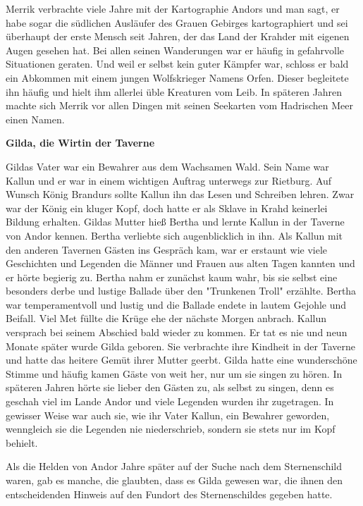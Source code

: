 \documentclass[10pt, a4paper, oneside]{book}
\begin{document}
\begin{multicols}{2}
Merrik verbrachte viele Jahre mit der Kartographie Andors und man sagt, er habe sogar die südlichen Ausläufer des Grauen Gebirges kartographiert und sei überhaupt der erste Mensch seit Jahren, der das Land der Krahder mit eigenen Augen gesehen hat. Bei allen seinen Wanderungen war er häufig in gefahrvolle Situationen geraten. Und weil er selbst kein guter Kämpfer war, schloss er bald ein Abkommen mit einem jungen Wolfskrieger Namens Orfen. Dieser begleitete ihn häufig und hielt ihm allerlei üble Kreaturen vom Leib. In späteren Jahren machte sich Merrik vor allen Dingen mit seinen Seekarten vom Hadrischen Meer einen Namen.\bigskip

 

\textbf{Gilda, die Wirtin der Taverne}

Gildas Vater war ein Bewahrer aus dem Wachsamen Wald. Sein Name war Kallun und er war in einem wichtigen Auftrag unterwegs zur Rietburg. Auf Wunsch König Brandurs sollte Kallun ihn das Lesen und Schreiben lehren. Zwar war der König ein kluger Kopf, doch hatte er als Sklave in Krahd keinerlei Bildung erhalten. Gildas Mutter hieß Bertha und lernte Kallun in der Taverne von Andor kennen. Bertha verliebte sich augenblicklich in ihn. Als Kallun mit den anderen Tavernen Gästen ins Gespräch kam, war er erstaunt wie viele Geschichten und Legenden die Männer und Frauen aus alten Tagen kannten und er hörte begierig zu. Bertha nahm er zunächst kaum wahr, bis sie selbst eine besonders derbe und lustige Ballade über den "Trunkenen Troll" erzählte. Bertha war temperamentvoll und lustig und die Ballade endete in lautem Gejohle und Beifall. Viel Met füllte die Krüge ehe der nächste Morgen anbrach. Kallun versprach bei seinem Abschied bald wieder zu kommen. Er tat es nie und neun Monate später wurde Gilda geboren. Sie verbrachte ihre Kindheit in der Taverne und hatte das heitere Gemüt ihrer Mutter geerbt. Gilda hatte eine wunderschöne Stimme und häufig  kamen Gäste von weit her, nur um sie singen zu hören. In späteren Jahren hörte sie lieber den Gästen zu, als selbst zu singen, denn es geschah viel im Lande Andor und viele Legenden wurden ihr zugetragen. In gewisser Weise war auch sie, wie ihr Vater Kallun, ein Bewahrer geworden, wenngleich sie die Legenden nie niederschrieb, sondern sie stets nur im Kopf behielt.\bigskip

Als die Helden von Andor Jahre später auf der Suche nach dem Sternenschild waren, gab es manche, die glaubten, dass es Gilda gewesen war, die ihnen den entscheidenden Hinweis auf den Fundort des Sternenschildes gegeben hatte.\bigskip


\end{multicols}
\end{document}
